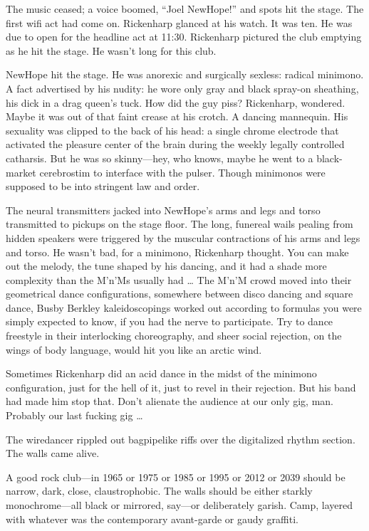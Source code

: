 The music ceased; a voice boomed, “Joel NewHope!” and spots hit the stage. The first wifi act had come on. Rickenharp glanced at his watch. It was ten. He was due to open for the headline act at 11:30. Rickenharp pictured the club emptying as he hit the stage. He wasn’t long for this club.

NewHope hit the stage. He was anorexic and surgically sexless: radical minimono. A fact advertised by his nudity: he wore only gray and black spray-on sheathing, his dick in a drag queen’s tuck. How did the guy piss? Rickenharp, wondered. Maybe it was out of that faint crease at his crotch. A dancing mannequin. His sexuality was clipped to the back of his head: a single chrome electrode that activated the pleasure center of the brain during the weekly legally controlled catharsis. But he was so skinny—hey, who knows, maybe he went to a black-market cerebrostim to interface with the pulser. Though minimonos were supposed to be into stringent law and order.

The neural transmitters jacked into NewHope’s arms and legs and torso transmitted to pickups on the stage floor. The long, funereal wails pealing from hidden speakers were triggered by the muscular contractions of his arms and legs and torso. He wasn’t bad, for a minimono, Rickenharp thought. You can make out the melody, the tune shaped by his dancing, and it had a shade more complexity than the M’n’Ms usually had … The M’n’M crowd moved into their geometrical dance configurations, somewhere between disco dancing and square dance, Busby Berkley kaleidoscopings worked out according to formulas you were simply expected to know, if you had the nerve to participate. Try to dance freestyle in their interlocking choreography, and sheer social rejection, on the wings of body language, would hit you like an arctic wind.

Sometimes Rickenharp did an acid dance in the midst of the minimono configuration, just for the hell of it, just to revel in their rejection. But his band had made him stop that. Don’t alienate the audience at our only gig, man. Probably our last fucking gig …

The wiredancer rippled out bagpipelike riffs over the digitalized rhythm section. The walls came alive.

A good rock club—in 1965 or 1975 or 1985 or 1995 or 2012 or 2039 should be narrow, dark, close, claustrophobic. The walls should be either starkly monochrome—all black or mirrored, say—or deliberately garish. Camp, layered with whatever was the contemporary avant-garde or gaudy graffiti.

